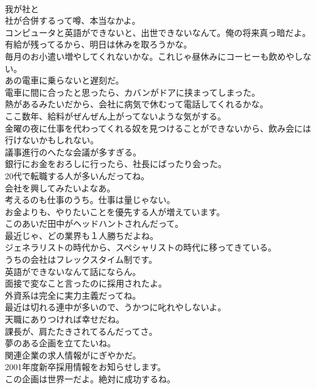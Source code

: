 \documentclass[8pt]{extreport}
\begin{document}
\begin{CJK}{UTF8}{min}
\\	我が社と
\\	社が合併するって噂、本当なかよ。	
\\	コンピュータと英語ができないと、出世できないなんて。俺の将来真っ暗だよ。	
\\	有給が残ってるから、明日は休みを取ろうかな。	
\\	毎月のお小遣い増やしてくれないかな。これじゃ昼休みにコーヒーも飲めやしない。	
\\	あの電車に乗らないと遅刻だ。	
\\	電車に間に合ったと思ったら、カバンがドアに挟まってしまった。	
\\	熱があるみたいだから、会社に病気で休むって電話してくれるかな。	
\\	ここ数年、給料がぜんぜん上がってないような気がする。	
\\	金曜の夜に仕事を代わってくれる奴を見つけることができないから、飲み会には行けないかもしれない。	
\\	議事進行のへたな会議が多すぎる。	
\\	銀行にお金をおろしに行ったら、社長にばったり会った。	
\\	20代で転職する人が多いんだってね。	
\\	会社を興してみたいよなあ。	
\\	考えるのも仕事のうち。仕事は量じゃない。	
\\	お金よりも、やりたいことを優先する人が増えています。	
\\	このあいだ田中がヘッドハントされんだって。	
\\	最近じゃ、どの業界も１人勝ちだよね。	
\\	ジェネラリストの時代から、スペシャリストの時代に移ってきている。	
\\	うちの会社はフレックスタイム制です。	
\\	英語ができないなんて話にならん。	
\\	面接で変なこと言ったのに採用されたよ。	
\\	外資系は完全に実力主義だってね。	
\\	最近は切れる連中が多いので、うかつに叱れやしないよ。	
\\	天職にありつければ幸せだね。	
\\	課長が、肩たたきされてるんだってさ。	
\\	夢のある企画を立てたいね。	
\\	関連企業の求人情報がにぎやかだ。	
\\	2001年度新卒採用情報をお知らせします。	
\\	この企画は世界一だよ。絶対に成功するね。	

\end{CJK}
\end{document}
